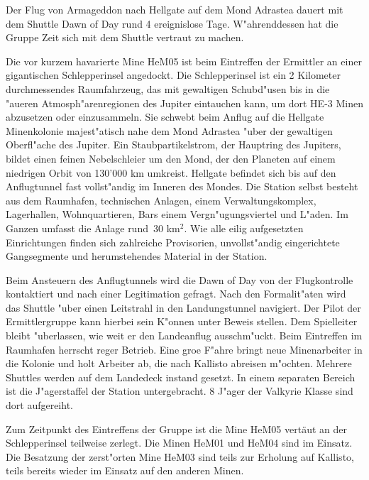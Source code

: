 
Der Flug von Armageddon nach Hellgate auf dem Mond Adrastea dauert mit dem Shuttle Dawn of Day rund 4 ereignislose Tage. W"ahrenddessen hat die Gruppe Zeit sich mit dem Shuttle vertraut zu machen. 

Die vor kurzem havarierte Mine HeM05 ist beim Eintreffen der Ermittler an einer gigantischen Schlepperinsel  angedockt. Die Schlepperinsel ist ein 2 Kilometer durchmessendes Raumfahrzeug, das mit gewaltigen Schubd"usen bis in die "au\3eren Atmosph"arenregionen des Jupiter eintauchen kann, um dort HE-3 Minen abzusetzen oder einzusammeln. Sie schwebt beim Anflug auf die Hellgate Minenkolonie majest"atisch nahe dem Mond Adrastea "uber der gewaltigen Oberfl"ache des Jupiter. Ein Staubpartikelstrom, der Hauptring des Jupiters, bildet einen feinen Nebelschleier um den Mond, der den Planeten auf einem niedrigen Orbit von 130'000 km umkreist. Hellgate befindet sich bis auf den Anflugtunnel fast vollst"andig im Inneren des Mondes. Die Station selbst besteht aus dem Raumhafen, technischen Anlagen, einem Verwaltungskomplex, Lagerhallen, Wohnquartieren, Bars einem Vergn"ugungsviertel und L"aden. Im Ganzen umfasst die Anlage rund~30 km$^{2}$. Wie alle eilig aufgesetzten Einrichtungen finden sich zahlreiche Provisorien, unvollst"andig eingerichtete Gangsegmente und herumstehendes Material in der Station.

Beim Ansteuern des Anflugtunnels wird die Dawn of Day von der Flugkontrolle kontaktiert und nach einer Legitimation gefragt. Nach den  Formalit"aten wird das Shuttle "uber einen Leitstrahl in den Landungstunnel navigiert. Der Pilot der Ermittlergruppe kann hierbei sein K"onnen unter Beweis stellen. Dem Spielleiter bleibt "uberlassen, wie weit er den Landeanflug ausschm"uckt. Beim Eintreffen im Raumhafen herrscht reger Betrieb. Eine gro\3e F"ahre bringt neue Minenarbeiter in die Kolonie und holt Arbeiter ab, die nach Kallisto abreisen m"ochten. Mehrere Shuttles werden auf dem Landedeck instand gesetzt. In einem separaten Bereich ist die J"agerstaffel der Station untergebracht. 8 J"ager der Valkyrie Klasse sind dort aufgereiht. 

Zum Zeitpunkt des Eintreffens der Gruppe ist die Mine HeM05 vertäut an der Schlepperinsel teilweise zerlegt. Die Minen HeM01 und HeM04 sind im Einsatz. Die Besatzung der zerst"orten Mine HeM03 sind teils zur Erholung auf Kallisto, teils bereits wieder im Einsatz auf den anderen Minen.

